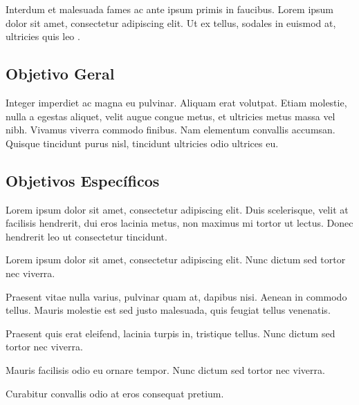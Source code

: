 Interdum et malesuada fames ac ante ipsum primis in faucibus. Lorem ipsum dolor sit amet, consectetur adipiscing elit. Ut ex tellus, sodales in euismod at, ultricies quis leo \cite{alecrim2008site}.

\subsection{Objetivo Geral}
\label{sec:objetivo-geral}

Integer imperdiet ac magna eu pulvinar. Aliquam erat volutpat. Etiam molestie, nulla a egestas aliquet, velit augue congue metus, et ultricies metus massa vel nibh. Vivamus viverra commodo finibus. Nam elementum convallis accumsan. Quisque tincidunt purus nisl, tincidunt ultricies odio ultrices eu.

\subsection{Objetivos Específicos}
\label{sec:objetivos-especificos}

Lorem ipsum dolor sit amet, consectetur adipiscing elit. Duis scelerisque, velit at facilisis hendrerit, dui eros lacinia metus, non maximus mi tortor ut lectus. Donec hendrerit leo ut consectetur tincidunt. 

	\begin{alineas}
		\item Lorem ipsum dolor sit amet, consectetur adipiscing elit. Nunc dictum sed tortor nec viverra.
		\item Praesent vitae nulla varius, pulvinar quam at, dapibus nisi. Aenean in commodo tellus. Mauris molestie est sed justo malesuada, quis feugiat tellus venenatis.
		\item Praesent quis erat eleifend, lacinia turpis in, tristique tellus. Nunc dictum sed tortor nec viverra.
		\item Mauris facilisis odio eu ornare tempor. Nunc dictum sed tortor nec viverra.
		\item Curabitur convallis odio at eros consequat pretium.
	\end{alineas}